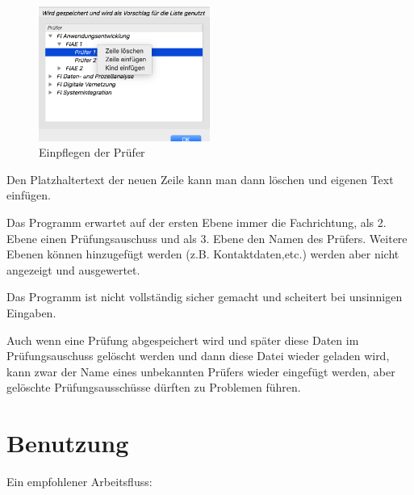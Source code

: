 \documentclass[a4paper,notitlepage,parskip=half]{scrartcl}
\begin{document}
\begin{figure}[ht]
  \centering
  \includegraphics[width=0.5\textwidth]{Einstellungen2.png}
  \caption{Einpflegen der Prüfer}
  \label{fig:einstellungen2}
\end{figure}

Den Platzhaltertext der neuen Zeile kann man dann löschen und eigenen Text einfügen.

\begin{marker}
Das Programm erwartet auf der ersten Ebene immer die Fachrichtung, als 2. Ebene einen Prüfungsauschuss und als 3. Ebene den Namen des Prüfers. Weitere Ebenen können hinzugefügt werden (z.B. Kontaktdaten,etc.) werden aber nicht angezeigt und ausgewertet.
\end{marker}

Das Programm ist nicht vollständig sicher gemacht und scheitert bei unsinnigen Eingaben.

Auch wenn eine Prüfung abgespeichert wird und später diese Daten im Prüfungsauschuss gelöscht werden und dann diese Datei wieder geladen wird, kann zwar der Name eines unbekannten Prüfers wieder eingefügt werden, aber gelöschte Prüfungsausschüsse dürften zu Problemen führen.

\section{Benutzung}

Ein empfohlener Arbeitsfluss:
\end{document}
